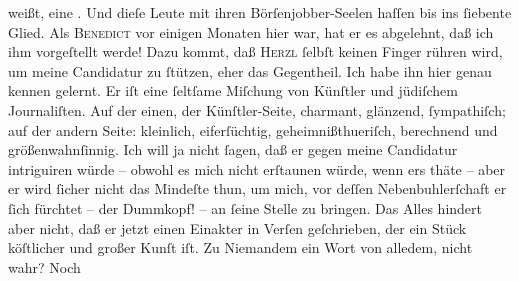 \begin{ledgroupsized}[t]{13cm}
               weißt, eine \label{K_L02619-5v}\label{K_L02619-5h}. Und dieſe Leute mit ihren
               Börſenjobber-Seelen haſſen bis ins ſiebente Glied. Als \textsc{Benedict} vor einigen Monaten hier war, hat er es abgelehnt, daß ich ihm vorgeſtellt
               werde! Dazu kommt, daß \textsc{Herzl} ſelbſt keinen Finger rühren wird, um meine Candidatur zu ſtützen, eher das
               Gegentheil. Ich habe ihn hier genau kennen gelernt. Er iſt {\pb}eine ſeltſame Miſchung von Künſtler und jüdiſchem
               Journaliſten. Auf der einen, der Künſtler-Seite, charmant, glänzend, ſympathiſch; auf
               der andern Seite: kleinlich, eiferſüchtig,  geheimnißthueriſch, berechnend und größenwahnſinnig. Ich will ja nicht ſagen,
               daß er gegen meine Candidatur intriguiren würde – obwohl es mich nicht erſtaunen
               würde, wenn ers thäte – aber er wird ſicher nicht das Mindeſte thun, um mich, vor
               deſſen Nebenbuhlerſchaft er ſich fürchtet – der Dummkopf! – an ſeine Stelle zu bringen. Das Alles hindert
               aber {\pb}nicht, daß er jetzt einen Einakter in Verſen geſchrieben, der ein Stück
               köſtlicher und großer Kunſt iſt. Zu Niemandem ein Wort von alledem, nicht wahr? Noch

\end{ledgroupsized}
